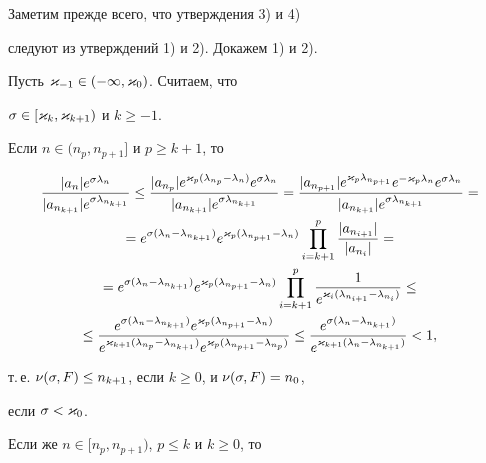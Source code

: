 \begin{pf}


Заметим прежде всего, что утверждения 3) и 4)


следуют из утверждений 1) и 2). Докажем 1) и 2).





Пусть $\varkappa_{-1}\in(-\infty,\varkappa_0)$. Считаем, что


$\sigma\in[\varkappa_k,\varkappa_{k+1})$ и $k\ge -1$.





Если $n\in (n_p,n_{p+1}]$ и $p\ge k+1$, то


\begin{gather*}


\frac{|a_n|e^{\s\l_n}}{|a_{n_{k+1}}|e^{\s\l_{n_{k+1}}}}\le


\frac{|a_{n_p}|e^{\k_p(\l_{n_p}-\l_n)}


e^{\s\l_n}}{|a_{n_{k+1}}|e^{\s\l_{n_{k+1}}}}=


\frac{|a_{n_{p+1}}|e^{\k_p\l_{n_{p+1}}}e^{-\k_p\l_n}


e^{\s\l_n}}{|a_{n_{k+1}}|e^{\s\l_{n_{k+1}}}}=\\


=e^{\s(\l_n-\l_{n_{k+1}})}e^{\k_p(\l_{n_{p+1}}-\l_n)}


\prod_{i=k+1}^{p}\frac{|a_{n_{i+1}}|}{|a_{n_{i}}|}=\\


=e^{\s(\l_n-\l_{n_{k+1}})}e^{\k_p(\l_{n_{p+1}}-\l_n)}


\prod_{i=k+1}^{p}\frac1{e^{\k_i(\l_{n_{i+1}}-\l_{n_i})}}\le\\


\le\frac{e^{\s(\l_n-\l_{n_{k+1}})}e^{\k_p(\l_{n_{p+1}}-\l_n)}}


{e^{\k_{k+1}(\l_{n_p}-\l_{n_{k+1}})}e^{\k_p(\l_{n_{p+1}}-\l_{n_p})}}\le


\frac{e^{\s(\l_n-\l_{n_{k+1}})}}


{e^{\k_{k+1}(\l_n-\l_{n_{k+1}})}}<1,


\end{gather*}


т.\,е. $\nu(\sigma,F)\le n_{k+1}$, если $k\ge 0$, и $\nu(\sigma,F)= n_0$,


если $\sigma<\varkappa_0$.





Если же $n\in [n_p,n_{p+1})$, $p\le k$ и $k\ge 0$, то


\begin{gather*}



\end{gather*}
\end{pf}
